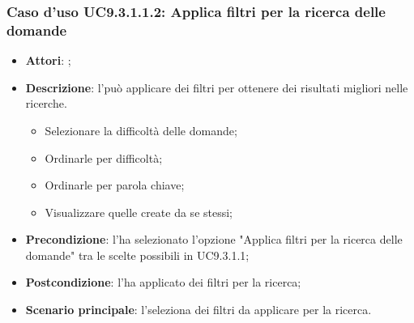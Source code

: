 		 \subsubsection{Caso d'uso UC9.3.1.1.2: Applica filtri per la ricerca delle domande}
		 \label{UC9.3.1.1.2}
		 \begin{itemize}
		 	\item \textbf{Attori}: \uaupro;
		 	\item \textbf{Descrizione}: l'\uaupro può applicare dei filtri per ottenere dei risultati migliori nelle ricerche. 
			 	\begin{itemize}
					\item Selezionare la difficoltà delle domande;
					\item Ordinarle per difficoltà;
					\item Ordinarle per parola chiave;
					\item Visualizzare quelle create da se stessi;
			 	\end{itemize}
		 	\item \textbf{Precondizione}: l'\uaupro ha selezionato l'opzione "Applica filtri per la ricerca delle domande" tra le scelte possibili in UC9.3.1.1;
		 	\item \textbf{Postcondizione}: l'\uaupro ha applicato dei filtri per la ricerca; 
		 	\item \textbf{Scenario principale}: l'\uaupro seleziona dei filtri da applicare per la ricerca.
		 \end{itemize}
		 
